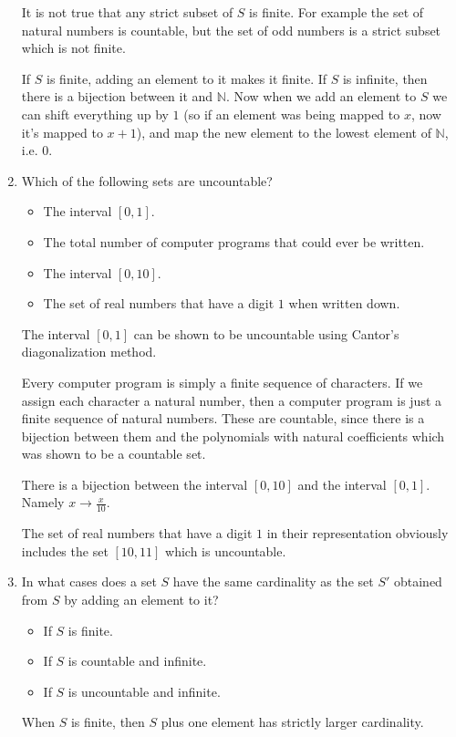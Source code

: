 \documentclass[11pt,preview]{standalone} %
\begin{document}
\begin{enumerate}
\begin{Multi}
	It is not true that any strict subset of $S$ is finite. For example the set of natural numbers is countable, but the set of odd numbers is a strict subset which is not finite.
	
	If $S$ is finite, adding an element to it makes it finite. If $S$ is infinite, then there is a bijection between it and $\mathbb{N}$. Now when we add an element to $S$ we can shift everything up by $1$ (so if an element was being mapped to $x$, now it's mapped to $x+1$), and map the new element to the lowest element of $\mathbb{N}$, i.e. $0$.
	\end{Multi}

	\item Which of the following sets are uncountable?
	\begin{Multi}
	\begin{itemize}
		\TrueChoice\item The interval $[0, 1]$.
		\FalseChoice\item The total number of computer programs that could ever be written.
		\TrueChoice\item The interval $[0, 10]$.
		\TrueChoice\item The set of real numbers that have a digit $1$ when written down.
	\end{itemize}
	\Solution The interval $[0,1]$ can be shown to be uncountable using Cantor's diagonalization method.
	
	Every computer program is simply a finite sequence of characters. If we assign each character a natural number, then a computer program is just a finite sequence of natural numbers. These are countable, since there is a bijection between them and the polynomials with natural coefficients which was shown to be a countable set.
	
	There is a bijection between the interval $[0,10]$ and the interval $[0,1]$. Namely $x\to \frac{x}{10}$.
	
	The set of real numbers that have a digit $1$ in their representation obviously includes the set $[10,11]$ which is uncountable.
	\end{Multi}

	\item In what cases does a set $S$ have the same cardinality as the set $S'$ obtained from $S$ by adding an element to it?
	\begin{Multi}
	\begin{itemize}
		\FalseChoice\item If $S$ is finite.
		\TrueChoice\item If $S$ is countable and infinite.
		\TrueChoice\item If $S$ is uncountable and infinite.
	\end{itemize}
	\Solution When $S$ is finite, then $S$ plus one element has strictly larger cardinality.
	

\end{Multi}
\end{enumerate}
\end{document}
